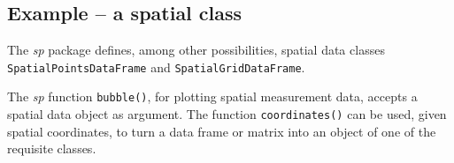 \documentclass{tufte-book}\usepackage[]{graphicx}\usepackage[]{color}
\newcommand{\txtt}[1]{\texttt{#1}}
\begin{document}
\subsection*{Example -- a spatial class}\label{ss:bubble}

The {\em sp} package defines, among other possibilities, spatial data
classes \txtt{SpatialPointsDataFrame} and \txtt{SpatialGridDataFrame}.

The {\em sp} function \txtt{bubble()}, for plotting spatial measurement data,
accepts a spatial data object as argument.
The function \txtt{coordinates()} can be used, given spatial coordinates,
to turn a data frame or matrix into an object of one of the requisite
classes.
\end{document}
